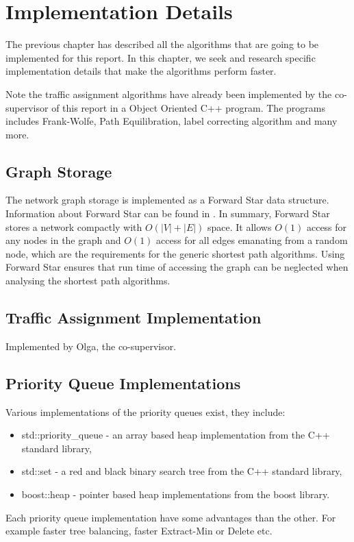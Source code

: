 \chapter{Implementation Details} \label{chap:implementation}

The previous chapter has described all the algorithms that are going to be implemented for this report. 
In this chapter, we seek and research specific implementation details that make the algorithms perform faster.

Note the traffic assignment algorithms have already been implemented by the co-supervisor of this report in a Object Oriented C++ program.
The programs includes Frank-Wolfe, Path Equilibration,
label correcting algorithm and many more.

\section{Graph Storage}
The network graph storage is implemented as a Forward Star data structure.
Information about Forward Star can be found in \citep{Sheffi}.
In summary, Forward Star stores a network compactly with $O(|V|+|E|)$ space.
It allows $O(1)$ access for any nodes in the graph and $O(1)$ access
for all edges emanating from a random node,
which are the requirements for the generic shortest path algorithms.
Using Forward Star ensures that run time of accessing the graph can be neglected when analysing the shortest path algorithms.

\section{Traffic Assignment Implementation}
Implemented by Olga, the co-supervisor.

\section{Priority Queue Implementations} \label{section:pq_implementation}

Various implementations of the priority queues exist,
they include:
\begin{itemize}
    \item std::priority\_queue - an array based heap implementation from the C++ standard library,
    \item std::set - a red and black binary search tree from the C++ standard library,
    \item boost::heap - pointer based heap implementations from the boost library.
\end{itemize}
Each priority queue implementation have some advantages than the other.
For example faster tree balancing, faster Extract-Min or Delete etc.

